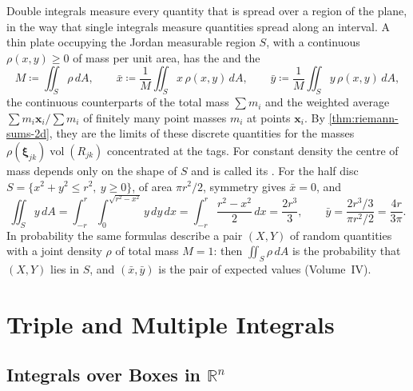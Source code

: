 Double integrals measure every quantity that is spread over a region of the plane, in the way that single integrals measure quantities spread along an interval. A thin plate occupying the Jordan measurable region $S$, with a continuous  $\rho(x,y)\ge0$ of mass per unit area, has the  and the 
\[
M\coloneqq\iint_S\rho\,dA,\qquad\bar x\coloneqq\frac1M\iint_Sx\,\rho(x,y)\,dA,\qquad\bar y\coloneqq\frac1M\iint_Sy\,\rho(x,y)\,dA ,
\]
the continuous counterparts of the total mass $\sum m_i$ and the weighted average $\sum m_i\mathbf x_i/\sum m_i$ of finitely many point masses $m_i$ at points $\mathbf x_i$. By \cref{thm:riemann-sums-2d}, they are the limits of these discrete quantities for the masses $\rho(\boldsymbol\xi_{jk})\operatorname{vol}(R_{jk})$ concentrated at the tags. For constant density the centre of mass depends only on the shape of $S$ and is called its . For the half disc $S=\{x^2+y^2\le r^2,\ y\ge0\}$, of area $\pi r^2/2$, symmetry gives $\bar x=0$, and
\[
\iint_Sy\,dA=\int_{-r}^r\int_0^{\sqrt{r^2-x^2}}y\,dy\,dx=\int_{-r}^r\frac{r^2-x^2}2\,dx=\frac{2r^3}3,\qquad\bar y=\frac{2r^3/3}{\pi r^2/2}=\frac{4r}{3\pi} .
\]
In probability the same formulas describe a pair $(X,Y)$ of random quantities with a joint density $\rho$ of total mass $M=1$: then $\iint_S\rho\,dA$ is the probability that $(X,Y)$ lies in $S$, and $(\bar x,\bar y)$ is the pair of expected values (Volume~IV).

\section{Triple and Multiple Integrals}
\label{sec:multiple}

\subsection{Integrals over Boxes in \texorpdfstring{$\mathbb R^n$}{R\^{}n}}

